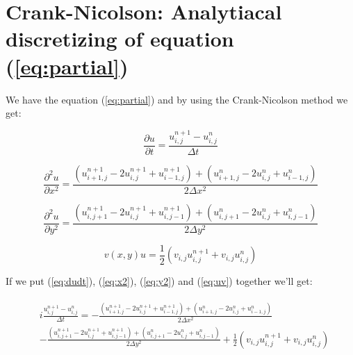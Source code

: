 \documentclass[english,notitlepage,reprint,nofootinbib]{revtex4-1}  %
\begin{document}
	
	\newpage
	\onecolumngrid
	\appendix
	
	\section{Crank-Nicolson: Analytiacal discretizing of equation (\ref{eq:partial})} \label{sec:ap2}
	
	We have the equation (\ref{eq:partial}) and by using the Crank-Nicolson method we get:
	
	\begin{equation} \label{eq:dudt}
		\frac{\partial u}{\partial t} = \frac{u_{i,j}^{n+1} - u_{i,j}^n}{\Delta t}
	\end{equation} 
	
	\begin{equation} \label{eq:x2}
		\frac{\partial^2 u}{\partial x^2} = \frac{ \left( u_{i+1, j}^{n+1} - 2u_{i, j}^{n+1} + u_{i-1, j}^{n+1} \right) + \left( u_{i+1, j}^{n} - 2u_{i, j}^{n} + u_{i-1, j}^{n} \right) }{2 \Delta x^2}
	\end{equation}
	
	\begin{equation} \label{eq:y2}
		\frac{\partial^2 u}{\partial y^2} = \frac{ \left( u_{i, j+1}^{n+1} - 2u_{i, j}^{n+1} + u_{i, j-1}^{n+1} \right) + \left( u_{i, j+1}^{n} - 2u_{i, j}^{n} + u_{i, j-1}^{n} \right) }{2 \Delta y^2}
	\end{equation}
	
	\begin{equation} \label{eq:uv}
		v(x,y)u = \frac{1}{2} \left(v_{i,j} u_{i,j}^{n+1} + v_{i,j} u_{i,j}^n\right)
	\end{equation}
	
	If we put (\ref{eq:dudt}), (\ref{eq:x2}), (\ref{eq:y2}) and (\ref{eq:uv}) together we'll get:
	
	\begin{align} \label{eq:step1}
		\begin{split}
			&i \frac{u_{i,j}^{n+1} - u_{i,j}^n}{\Delta t} = - \frac{ \left( u_{i+1, j}^{n+1} - 2u_{i, j}^{n+1} + u_{i-1, j}^{n+1} \right) + \left( u_{i+1, j}^{n} - 2u_{i, j}^{n} + u_{i-1, j}^{n} \right) }{2 \Delta x^2} \\ 
			&- \frac{ \left( u_{i, j+1}^{n+1} - 2u_{i, j}^{n+1} + u_{i, j-1}^{n+1} \right) + \left( u_{i, j+1}^{n} - 2u_{i, j}^{n} + u_{i, j-1}^{n} \right) }{2 \Delta y^2} + \frac{1}{2} \left(v_{i,j} u_{i,j}^{n+1} + v_{i,j} u_{i,j}^n\right)
		\end{split}
	\end{align}
	
\end{document}

